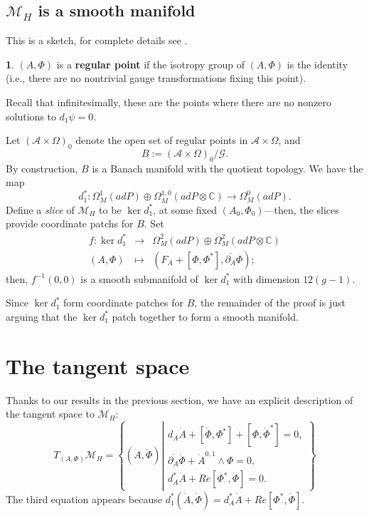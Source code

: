 \documentclass[oneside,english]{amsbook}
\numberwithin{section}{chapter}
\numberwithin{equation}{section}
\numberwithin{figure}{section}
\theoremstyle{plain}
\theoremstyle{definition}
\newtheorem{defn}[thm]{\protect\definitionname}
\theoremstyle{remark}
\theoremstyle{definition}
\theoremstyle{definition}
\theoremstyle{plain}
\providecommand{\definitionname}{Definition}
\begin{document}
\subsection{$\mathcal{M}_{H}$ is a smooth manifold}

This is a sketch, for complete details see \cite{H1}.
\begin{defn}
$\left(A,\Phi\right)$ is a \textbf{regular point} if the isotropy
group of $\left(A,\Phi\right)$ is the identity (i.e., there are no
nontrivial gauge transformations fixing this point).
\end{defn}
Recall that infinitesimally, these are the points where there are
no nonzero solutions to $d_{1}\dot{\psi}=0$.

Let $\left(\mathcal{A}\times\Omega\right)_{0}$ denote the open set
of regular points in $\mathcal{A}\times\Omega$, and
\[
B:=\left(\mathcal{A}\times\Omega\right)_{0}/\mathcal{G}.
\]
By construction, $B$ is a Banach manifold with the quotient topology.
We have the map
\[
d_{1}^{*}:\Omega_{M}^{1}\left(adP\right)\oplus\Omega_{M}^{1,0}\left(adP\otimes\mathbb{C}\right)\longrightarrow\Omega_{M}^{0}\left(adP\right).
\]
Define a \emph{slice} of $\mathcal{M}_{H}$ to be $\ker d_{1}^{*}$,
at some fixed $\left(A_{0},\Phi_{0}\right)$---then, the slices provide
coordinate patchs for $B$. Set
\begin{eqnarray*}
f:\ker d_{1}^{*} & \longrightarrow & \Omega_{M}^{2}\left(adP\right)\oplus\Omega_{M}^{2}\left(adP\otimes\mathbb{C}\right)\\
\left(A,\Phi\right) & \mapsto & \left(F_{A}+\left[\Phi,\Phi^{*}\right],\overline{\partial_{A}}\Phi\right);
\end{eqnarray*}
then, $f^{-1}\left(0,0\right)$ is a smooth submanifold of $\ker d_{1}^{*}$
with dimension $12(g-1)$.

Since $\ker d_{1}^{*}$ form coordinate patches for $B$, the remainder
of the proof is just arguing that the $\ker d_{1}^{*}$ patch together
to form a smooth manifold.


\section{The tangent space}

Thanks to our results in the previous section, we have an explicit
description of the tangent space to $\mathcal{M}_{H}$:
\[
T_{\left(A,\Phi\right)}\mathcal{M}_{H}=\left\{
\left(\dot{A},\dot{\Phi}\right)\left|\begin{matrix}d_{A}\dot{A}+\left[\dot{\Phi},\Phi^{*}\right]+\left[\Phi,\dot{\Phi}^{*}\right]=0,\\
\overline{\partial_{A}}\dot{\Phi}+\dot{A}^{0,1}\wedge\Phi=0,\\
d_{A}^{*}\dot{A}+Re\left[\Phi^{*},\dot{\Phi}\right]=0.
\end{matrix}\right.\right\}
\]
The third equation appears because $d_{1}^{*}\left(\dot{A},\dot{\Phi}\right)=d_{A}^{*}\dot{A}+Re\left[\Phi^{*},\dot{\Phi}\right]$.
\end{document}
